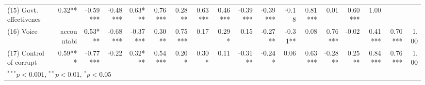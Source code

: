 \begin{table}[htbp]
\begin{tabular}{lrrrrrrrrrrrrrrrrr}
(15) Govt. effectivenes & 0.32** & -0.59*** & -0.48*** & 0.63*** & 0.76*** & 0.28** & 0.63*** & 0.46*** & -0.39*** & -0.39*** & -0.18 & 0.81*** & 0.01 & 0.60*** & 1.00 &  &  \\
(16) Voice & accountabi & 0.53*** & -0.68*** & -0.37*** & 0.30** & 0.75*** & 0.17 & 0.29* & 0.15 & -0.27** & -0.31** & 0.08 & 0.76*** & -0.02 & 0.41*** & 0.70*** & 1.00 &  \\
(17) Control of corrupt & 0.59*** & -0.77*** & -0.22 & 0.32*** & 0.54*** & 0.20* & 0.30* & 0.11 & -0.31** & -0.24* & 0.06 & 0.63*** & -0.28** & 0.25** & 0.84*** & 0.76*** & 1.00 \\
\bottomrule
\multicolumn{18}{l}{\footnotesize $^{***}p<0.001$, $^{**}p<0.01$, $^{*}p<0.05$} \\
\end{tabular}
\end{table}